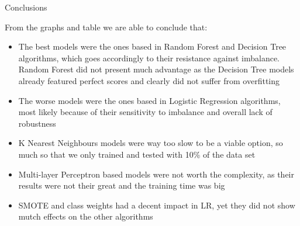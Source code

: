\begin{frame}{Conclusions}
    
    From the graphs and table we are able to conclude that:
    \begin{itemize}
        \item The best models were the ones based in Random Forest and Decision Tree algorithms, which goes accordingly to their resistance against imbalance. Random Forest did not present much advantage as the Decision Tree models already featured perfect scores and clearly did not suffer from overfitting
        \item The worse models were the ones based in Logistic Regression algorithms, most likely because of their sensitivity to imbalance and overall lack of robustness
        \item K Nearest Neighbours models were way too slow to be a viable option, so much so that we only trained and tested with 10\% of the data set
        \item Multi-layer Perceptron based models were not worth the complexity, as their results were not their great and the training time was big
        \item SMOTE and class weights had a decent impact in LR, yet they did not show mutch effects on the other algorithms
    \end{itemize}

\end{frame}
